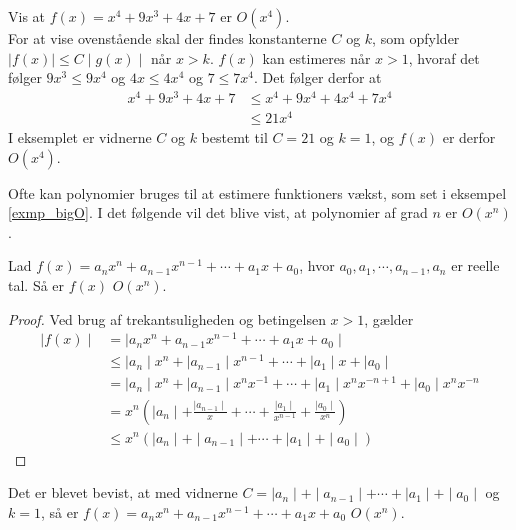 \begin{exmp}\label{exmp_bigO}
Vis at $f(x)=x^4+9x^3+4x+7$ er $O(x^4)$. \\
For at vise ovenstående skal der findes konstanterne $C$ og $k$, som opfylder $\mid f(x) \mid \leq C \mid g(x) \mid$ når $x>k$. $f(x)$ kan estimeres når $x>1$, hvoraf det følger $9x^3\leq 9x^4$ og $4x\leq 4x^4$ og $7\leq 7x^4$. Det følger derfor at 
\begin{align*}
x^4+9x^3+4x+7 &\leq x^4+9x^4+4x^4+7x^4 \\
&\leq 21x^4
\end{align*}
I eksemplet er vidnerne $C$ og $k$ bestemt til $C=21$ og $k=1$, og $f(x)$ er derfor $O(x^4)$. 
\end{exmp} 
Ofte kan polynomier bruges til at estimere funktioners vækst, som set i eksempel \ref{exmp_bigO}. 
I det følgende vil det blive vist, at polynomier af grad $n$ er $O(x^n)$. \\
\begin{defn}
Lad $f(x)=a_nx^n+a_{n-1}x^{n-1}+\cdots +a_1x+a_0$, hvor $a_0, a_1, \cdots, a_{n-1}, a_n$ er reelle tal. 
Så er $f(x)$ $O(x^n)$.
\end{defn}

\begin{proof}
Ved brug af trekantsuligheden og betingelsen $x>1$, gælder
	\begin{align*}
		\mid f(x) \mid &= \mid a_nx^n+a_{n-1}x^{n-1}+ \cdots +a_1x+a_0 \mid \\
		&\leq \mid a_n \mid x^n + \mid a_{n-1} \mid x^{n-1}+ \cdots +\mid a_1 \mid x+\mid a_0 \mid \\
		&= \mid a_n \mid x^n + \mid a_{n-1} \mid x^nx^{-1}+ \cdots + \mid a_1 \mid x^n x^{-n+1}+\mid a_0 \mid x^nx^{-n} \\
		&= x^n \left( \mid a_n \mid + \frac{\mid a_{n-1} \mid}{x}+ \cdots +\frac{\mid a_1 \mid}{x^{n-1}}+\frac{\mid a_0 \mid}{x^n} \right) \\
		&\leq x^n( \mid a_n \mid + \mid a_{n-1} \mid + \cdots + \mid a_1 \mid + \mid a_0 \mid )
	\end{align*}
\end{proof}
Det er blevet bevist, at med vidnerne $C= \mid a_n \mid + \mid a_{n-1} \mid + \cdots + \mid a_1 \mid + \mid a_0 \mid$ og $k=1$, så er $f(x)=a_nx^n+a_{n-1}x^{n-1}+\cdots +a_1x+a_0$ $O(x^n)$. \\

